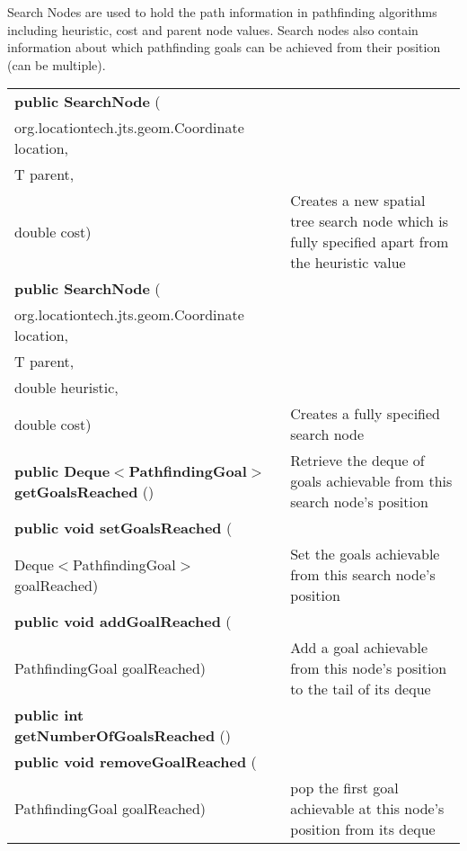  { Search Nodes are used to hold the path information in pathfinding algorithms including heuristic, cost and parent node values. Search nodes also contain information about which\newline%
 pathfinding goals can be achieved from their position (can be multiple).
 
\begin{tabular}{ p{3in}|m{3.4in}}
\textbf{public SearchNode } (\\ \hspace*{ 5pt} org.locationtech.jts.geom.Coordinate location,\\\hspace*{ 5pt} T parent,\\\hspace*{ 5pt} double cost) & Creates a new spatial tree search node which is fully specified apart from\newline%
 the heuristic value\\ \hline 
\textbf{public SearchNode } (\\ \hspace*{ 5pt} org.locationtech.jts.geom.Coordinate location,\\\hspace*{ 5pt} T parent,\\\hspace*{ 5pt} double heuristic,\\\hspace*{ 5pt} double cost) & Creates a fully specified search node\\ \hline 
\textbf{public Deque$<$PathfindingGoal$>$ getGoalsReached} () & Retrieve the deque of goals achievable from this search node's position\\ \hline 
\textbf{public void setGoalsReached } (\\ \hspace*{ 5pt} Deque$<$PathfindingGoal$>$ goalReached) & Set the goals achievable from this search node's position\\ \hline 
\textbf{public void addGoalReached } (\\ \hspace*{ 5pt} PathfindingGoal goalReached) & Add a goal achievable from this node's position to the tail of its deque\\ \hline 
\textbf{public int getNumberOfGoalsReached} () & \\ \hline 
\textbf{public void removeGoalReached } (\\ \hspace*{ 5pt} PathfindingGoal goalReached) & pop the first goal achievable at this node's position from its deque\\ \hline 

\end{tabular}}
